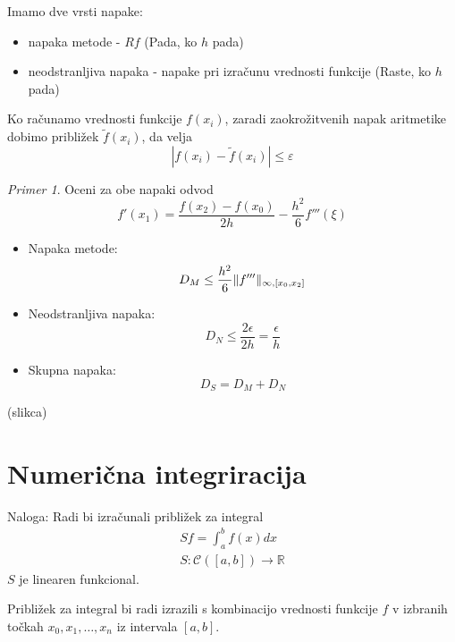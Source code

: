 \documentclass[a4paper,12pt]{article}
\DeclarePairedDelimiter\norm{\lVert}{\rVert}
\theoremstyle{definition}
\theoremstyle{remark}
\newtheorem*{ex}{Primer}
\newcommand{\R}{\mathbb{R}}
\begin{document}
Imamo dve vrsti napake:
\begin{itemize}
    \item napaka metode - $Rf$ (Pada, ko $h$ pada)
    \item neodstranljiva napaka - napake pri izračunu vrednosti funkcije (Raste, ko $h$ pada)
\end{itemize}

Ko računamo vrednosti funkcije $f(x_i)$, zaradi zaokrožitvenih napak aritmetike dobimo približek $\tilde{f}(x_i)$, da velja
\begin{equation*}
    \left| f(x_i) - \tilde{f}(x_i) \right| \leq \varepsilon
\end{equation*}

\begin{ex}
    Oceni za obe napaki odvod
    \begin{equation*}
        f'(x_1) = \frac{f(x_2) - f(x_0)}{2h} - \frac{h^2}{6} f'''(\xi)
    \end{equation*}
    \begin{itemize}
        \item Napaka metode:
        \begin{equation*}
            D_M \leq \frac{h^2}{6} \norm{f'''}_{\infty, [x_0, x_2]}
        \end{equation*}
        \item Neodstranljiva napaka:
        \begin{equation*}
            D_N \leq \frac{2\epsilon}{2h} = \frac{\epsilon}{h}
        \end{equation*}
        \item Skupna napaka:
        \begin{equation*}
            D_S = D_M + D_N
        \end{equation*}
    \end{itemize}
    (slikca)
\end{ex}

\section{Numerična integriracija}
Naloga: Radi bi izračunali približek za integral
\begin{gather*}
    Sf = \int_{a}^{b} f(x) dx \\
    S: \mathscr{C}([a, b]) \to \R
\end{gather*}
$S$ je linearen funkcional.

Približek za integral bi radi izrazili s kombinacijo vrednosti funkcije $f$ v izbranih točkah $x_0, x_1, \dots, x_n$ iz intervala $[a, b]$.
\end{document}
